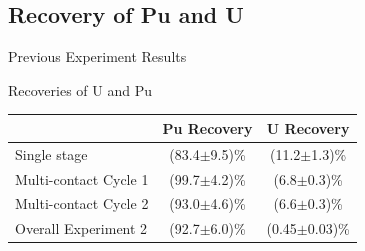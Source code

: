 \documentclass{beamer}
\begin{document}
\subsection{Recovery of Pu and U}
\begin{frame}{Previous Experiment Results}
  \begin{block}{Recoveries of U and Pu}
    \begin{center}
      \vskip -0.2cm
  \begin{tabular}{l  c  c}\toprule
                & Pu Recovery & U Recovery \\ \midrule \vspace{0.1cm}
   Single stage         & (83.4$\pm$9.5)\% & (11.2$\pm$1.3)\% \\
   Multi-contact Cycle 1 & (99.7$\pm$4.2)\% & (6.8$\pm$0.3)\% \\
   Multi-contact Cycle 2 & (93.0$\pm$4.6)\% & (6.6$\pm$0.3)\% \\
   Overall Experiment 2 & (92.7$\pm$6.0)\% & (0.45$\pm$0.03)\% \\ \bottomrule
  \end{tabular}
  \end{center}
  \end{block}
\end{frame}
\end{document}
